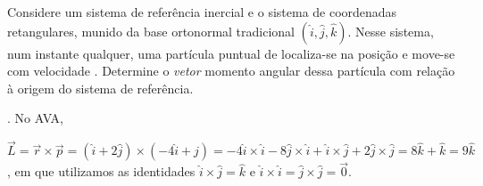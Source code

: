 \begin{question}
    Considere um sistema de referência inercial e o sistema de coordenadas retangulares, munido da base ortonormal tradicional $(\hat i, \hat j, \hat k)$.
    Nesse sistema, num instante qualquer, uma partícula puntual de  localiza-se na posição  e move-se com velocidade .
    Determine o \emph{vetor} momento angular dessa partícula com relação à origem do sistema de referência.

    \begin{answer}
      . No AVA, 
    \end{answer}
    
    \begin{solution}
      $\vec L = \vec r \times \vec p = (\hat i + 2\hat j) \times (-4\hat i + \hat j) = -4 \hat i \times \hat i - 8 \hat j \times \hat i + \hat i \times \hat j + 2\hat j \times \hat j = 8 \hat k + \hat k = 9 \hat k$, em que utilizamos as identidades $\hat i \times \hat j = \hat k$ e $\hat i \times \hat i = \hat j \times \hat j = \vec 0$.
    \end{solution}
\end{question}